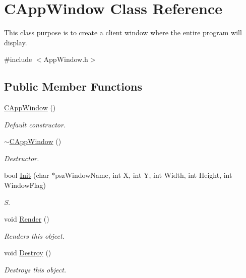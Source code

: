 \hypertarget{class_c_app_window}{}\section{C\+App\+Window Class Reference}
\label{class_c_app_window}


This class purpose is to create a client window where the entire program will display.  




{\ttfamily \#include $<$App\+Window.\+h$>$}

\subsection*{Public Member Functions}
\begin{DoxyCompactItemize}
\item 
\hyperlink{class_c_app_window_a257df117378cd56d3b1e710f107e65c0}{C\+App\+Window} ()\hypertarget{class_c_app_window_a257df117378cd56d3b1e710f107e65c0}{}\label{class_c_app_window_a257df117378cd56d3b1e710f107e65c0}

\begin{DoxyCompactList}\small\item\em Default constructor. \end{DoxyCompactList}\item 
\hyperlink{class_c_app_window_a3d361db3bd1bfaa9de28ea28b96b36f7}{$\sim$\+C\+App\+Window} ()\hypertarget{class_c_app_window_a3d361db3bd1bfaa9de28ea28b96b36f7}{}\label{class_c_app_window_a3d361db3bd1bfaa9de28ea28b96b36f7}

\begin{DoxyCompactList}\small\item\em Destructor. \end{DoxyCompactList}\item 
bool \hyperlink{class_c_app_window_aeeebd33128f0c18ec365a97f44dd862f}{Init} (char $\ast$psz\+Window\+Name, int X, int Y, int Width, int Height, int Window\+Flag)
\begin{DoxyCompactList}\small\item\em S. \end{DoxyCompactList}\item 
void \hyperlink{class_c_app_window_a00fa690eee9d0a55b16324df322c6e4f}{Render} ()
\begin{DoxyCompactList}\small\item\em Renders this object. \end{DoxyCompactList}\item 
void \hyperlink{class_c_app_window_aa0899521440dc79a025f79c3ceb1536d}{Destroy} ()
\begin{DoxyCompactList}\small\item\em Destroys this object. \end{DoxyCompactList}\end{DoxyCompactItemize}
